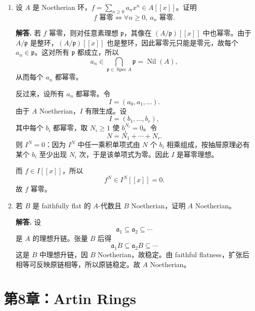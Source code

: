 \documentclass[a4paper]{ctexart}
\begin{document}
\begin{enumerate}[leftmargin=*, label=\textbf{7.\arabic*.}]
\item 设 \(A\) 是 Noetherian 环，\(f=\sum_{n\ge 0}a_nx^n\in A[[x]]\)。证明
\[
f \text{ 幂零}
\Longleftrightarrow
\forall n\ge 0,\ a_n \text{ 幂零}.
\]

\textbf{解答.}
若 \(f\) 幂零，则对任意素理想 \(\mathfrak p\)，其像在 \((A/\mathfrak p)[[x]]\) 中也幂零。由于 \(A/\mathfrak p\) 是整环，\((A/\mathfrak p)[[x]]\) 也是整环，因此幂零元只能是零元，故每个 \(a_n\in \mathfrak p\)。这对所有 \(\mathfrak p\) 都成立，所以
\[
a_n\in \bigcap_{\mathfrak p\in\operatorname{Spec}A}\mathfrak p=\operatorname{Nil}(A),
\]
从而每个 \(a_n\) 都幂零。

反过来，设所有 \(a_n\) 都幂零。令
\[
I=(a_0,a_1,\dots).
\]
由于 \(A\) Noetherian，\(I\) 有限生成。设
\[
I=(b_1,\dots,b_r),
\]
其中每个 \(b_i\) 都幂零，取 \(N_i\ge 1\) 使 \(b_i^{N_i}=0\)。令
\[
N=N_1+\cdots+N_r.
\]
则 \(I^N=0\)：因为 \(I^N\) 中任一乘积单项式由 \(N\) 个 \(b_i\) 相乘组成，按抽屉原理必有某个 \(b_i\) 至少出现 \(N_i\) 次，于是该单项式为零。因此 \(I\) 是幂零理想。

而 \(f\in I[[x]]\)，所以
\[
f^N\in I^N[[x]]=0.
\]
故 \(f\) 幂零。

\setcounter{enumi}{11}
\item 若 \(B\) 是 faithfully flat 的 \(A\)-代数且 \(B\) Noetherian，证明 \(A\) Noetherian。

\textbf{解答.}
设
\[
\mathfrak a_1\subseteq \mathfrak a_2\subseteq \cdots
\]
是 \(A\) 的理想升链。张量 \(B\) 后得
\[
\mathfrak a_1B\subseteq \mathfrak a_2B\subseteq \cdots
\]
这是 \(B\) 中理想升链，因 \(B\) Noetherian，故稳定。由 faithful flatness，扩张后相等可反映原链相等，所以原链稳定。故 \(A\) Noetherian。
\end{enumerate}

\section{第8章：Artin Rings}
\end{document}
